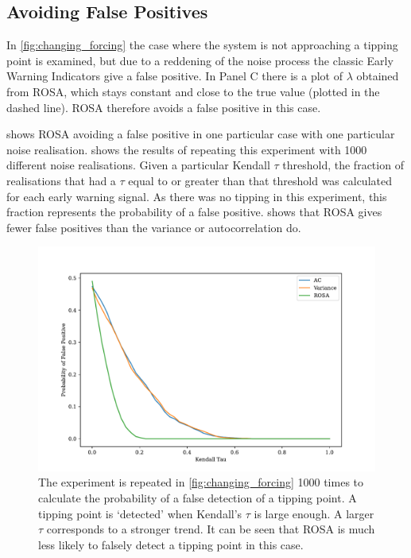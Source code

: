 \subsection{Avoiding False Positives}
In \cref{fig:changing_forcing} the case where the 
system is not approaching a tipping point is examined, but due to a reddening of 
the noise process the classic Early Warning Indicators give a 
false positive. In Panel C there is a plot of $\lambda$ obtained from ROSA, which stays constant and close to the true
value (plotted in the dashed line). ROSA therefore avoids a false positive in this case.

 shows ROSA avoiding a false positive in one particular case with one particular noise realisation.
 shows the results of repeating this experiment with 1000 different noise realisations. Given a particular
Kendall $\tau$ threshold, the fraction of realisations that had a $\tau$ equal to or greater than that threshold was calculated for each early
warning signal. As there was no tipping in this experiment, this fraction represents the probability of a false positive. 
shows that ROSA gives fewer false positives than the variance or autocorrelation do.

\begin{figure}
  \centering
  \includegraphics[width=\textwidth]{false_positives_whitenoise}
  \caption[False positive with white noise]{The experiment is repeated in \cref{fig:changing_forcing} 1000 times to
    calculate the probability of a false detection of a tipping point. A tipping point is `detected' when Kendall's $\tau$ is large enough. A larger $\tau$
    corresponds to a stronger trend. It can be seen that ROSA is much less likely to falsely detect a tipping point in this case.}
  \label{fig:false_positives_white}
\end{figure}


